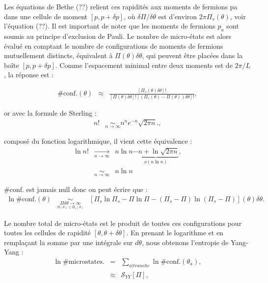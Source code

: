 	
	
Les équations de Bethe (??) relient ces rapidités aux moments de fermions pa dans une cellule de moment $[p, p+\delta p]$, où $\delta \Pi/\delta \theta$ est d'environ $2\pi \Pi_s(\theta)$, voir l'équation (??). Il est important de noter que les moments de fermions $p_a$ sont soumis au principe d'exclusion de Pauli. Le nombre de micro-états est alors évalué en comptant le nombre de configurations de moments de fermions mutuellement distincts, équivalent à $\Pi (\theta)\delta \theta$, qui peuvent être placées dans la boîte $[p, p + \delta p]$. Comme l'espacement minimal entre deux moments est de $2\pi /L$, la réponse est :
	
	\begin{eqnarray}
		\# \mbox{conf.}(\theta) & \approx  & \frac{[ \Pi_s ( \theta ) \delta \theta ] ! }{ [ \Pi ( \theta ) \delta \theta ] ! [( \Pi_s ( \theta ) - \Pi ( \theta ) )  \delta \theta ] ! } , 	
	\end{eqnarray}
	
	or avec la formule de Sterling :  
	\begin{eqnarray}
		n! & \underset{n \to \infty}{\sim} n^n e^{-n} \sqrt{2\pi n}.,
	\end{eqnarray}
	
	composé du fonction logarithmique, il vient cette équivalence : 
	\begin{eqnarray}
		\ln n! & \underset{n \to \infty}{\rightarrow} & n \ln n \underbrace{- n + \ln \sqrt{2 \pi n }}_{o \left ( n \ln n \right ) } ,\\
		&  \underset{n \to \infty}{\sim} & n \ln n  
	\end{eqnarray}
	
	$\# \mbox{conf.}$ est jamais null donc on peut écrire que : 
\begin{eqnarray}
    \ln \# \mbox{conf.}(\theta) & \underset{\underset{\Pi (\theta )\leq  \Pi_s (\theta )}{\Pi \delta \theta  \to \infty}}{\sim}   & [ \Pi_s\ln \Pi_s - \Pi \ln \Pi - ( \Pi_s - \Pi ) \ln ( \Pi_s - \Pi) ] (\theta )\delta \theta .
\end{eqnarray}

Le nombre total de micro-états est le produit de toutes ces configurations pour toutes les cellules de rapidité $[\theta, \theta + \delta \theta]$. En prenant le logarithme et en remplaçant la somme par une intégrale sur $d \theta$, nous obtenons l'entropie de Yang-Yang :
\begin{eqnarray}
    \ln \# \mbox{microstates.} & = & \sum_{a\vert tranche} \ln \# \mbox{conf.}(\theta_a), \\
    & \approx &   \mathcal{S}_{YY} [ \Pi ] , 	
\end{eqnarray}

